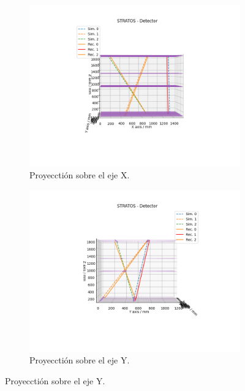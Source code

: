 \documentclass[a4paper]{article}
\begin{document}
\begin{figure}[H] 
  \begin{subfigure}[b]{0.5\linewidth}
    \centering
    \includegraphics[trim={4cm 3cm 3.9cm 1.9cm},clip,width=\linewidth]  {stratos_xproj.png} 
    \caption{Proyecctión sobre el eje X.} 
    \label{fg:4-a} 
  \end{subfigure}%
  \begin{subfigure}[b]{0.5\linewidth}
    \centering
    \includegraphics[trim={4cm 3cm 3.9cm 1.9cm},clip,width=\linewidth]  {stratos_yproj.png} 
    \caption{Proyecctión sobre el eje Y.} 
    \label{fg:4-b} 
  \end{subfigure} 

\end{figure}
\end{document}
